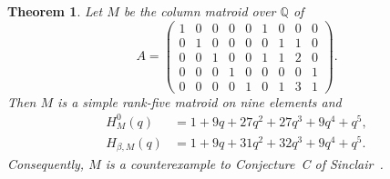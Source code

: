 \documentclass[11pt]{amsart}
\newtheorem{theorem}{Theorem}
\theoremstyle{remark}
\begin{document}
\begin{theorem}\label{thm:counterexample}
Let $M$ be the column matroid over $\mathbb Q$ of
\[
A=
\begin{pmatrix}
1&0&0&0&0&1&0&0&0\\
0&1&0&0&0&0&1&1&0\\
0&0&1&0&0&1&1&2&0\\
0&0&0&1&0&0&0&0&1\\
0&0&0&0&1&0&1&3&1
\end{pmatrix}.
\]
Then $M$ is a simple rank-five matroid on nine elements and
\begin{align*}
H_M^0(q)
 &=1+9q+27q^2+27q^3+9q^4+q^5,\\
H_{\beta,M}(q)
 &=1+9q+31q^2+32q^3+9q^4+q^5.
\end{align*}
Consequently, $M$ is a counterexample to Conjecture~C of
Sinclair~\cite{Sinclair}.
\end{theorem}
\end{document}
